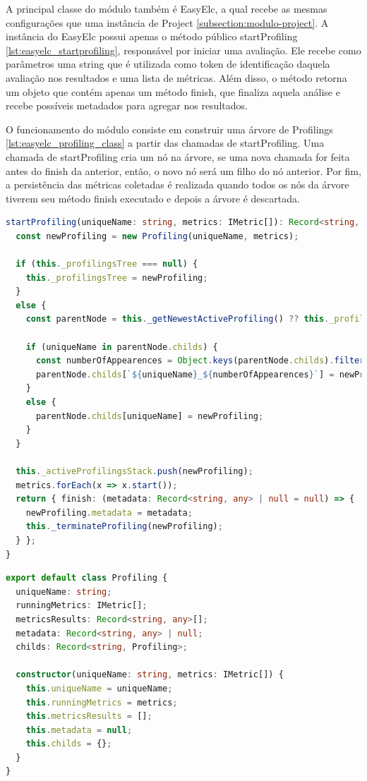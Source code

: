 \documentclass[12pt]{tcc}
\begin{document}
	A principal classe do módulo também é EasyElc, a qual recebe as mesmas configurações que uma instância de Project \ref{subsection:modulo-project}.
	A instância do EasyElc possui apenas o método público startProfiling \ref{lst:easyelc_startprofiling}, responsável por iniciar uma avaliação.
	Ele recebe como parâmetros uma string que é utilizada como token de identificação daquela avaliação nos resultados e uma lista de métricas.
	Além disso, o método retorna um objeto que contém apenas um método finish, que finaliza aquela análise e recebe possíveis metadados para agregar nos resultados.

	O funcionamento do módulo consiste em construir uma árvore de Profilings \ref{lst:easyelc_profiling_class} a partir das chamadas de startProfiling.
	Uma chamada de startProfiling cria um nó na árvore, se uma nova chamada for feita antes do finish da anterior, então, o novo nó será um filho do nó anterior.
	Por fim, a persistência das métricas coletadas é realizada quando todos os nós da árvore tiverem seu método finish executado e depois a árvore é descartada.

\begin{lstlisting}[label={lst:easyelc_startprofiling}, caption={Implementação do método startProfiling da classe EasyElc.}, language=TypeScript, breaklines=true]
startProfiling(uniqueName: string, metrics: IMetric[]): Record<string, any> {
  const newProfiling = new Profiling(uniqueName, metrics);

  if (this._profilingsTree === null) {
    this._profilingsTree = newProfiling;
  }
  else {
    const parentNode = this._getNewestActiveProfiling() ?? this._profilingsTree;

    if (uniqueName in parentNode.childs) {
      const numberOfAppearences = Object.keys(parentNode.childs).filter(k => k.match(new RegExp(`^${uniqueName}(\$|_[0-9]{1,}\$`))).length
      parentNode.childs[`${uniqueName}_${numberOfAppearences}`] = newProfiling;
    }
    else {
      parentNode.childs[uniqueName] = newProfiling;
    }
  }
  
  this._activeProfilingsStack.push(newProfiling);
  metrics.forEach(x => x.start());
  return { finish: (metadata: Record<string, any> | null = null) => {
    newProfiling.metadata = metadata;
    this._terminateProfiling(newProfiling);
  } };
}
\end{lstlisting}

\begin{lstlisting}[label={lst:easyelc_profiling_class}, caption={Implementação do nó da árvore de análises usado no EasyElc.}, language=TypeScript, breaklines=true]
export default class Profiling {
  uniqueName: string;
  runningMetrics: IMetric[];
  metricsResults: Record<string, any>[];
  metadata: Record<string, any> | null;
  childs: Record<string, Profiling>;

  constructor(uniqueName: string, metrics: IMetric[]) {
    this.uniqueName = uniqueName;
    this.runningMetrics = metrics;
    this.metricsResults = [];
    this.metadata = null;
    this.childs = {};
  }
}
\end{lstlisting}
\end{document}
